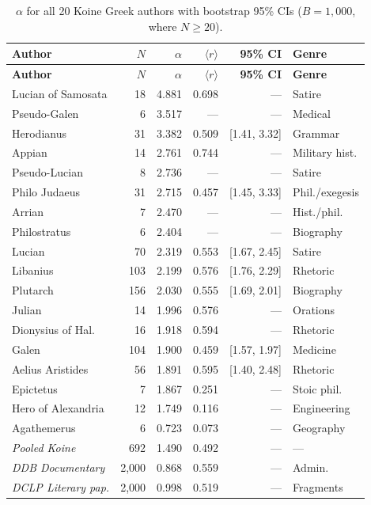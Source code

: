 \documentclass[11pt,letterpaper]{article}
\newcommand{\rbar}{\langle r \rangle}
\newcommand{\al}{\alpha}
\begin{document}
\begin{longtable}{lrrrrl}
\caption{$\al$ for all 20 Koine Greek authors with bootstrap 95\%
CIs ($B = 1{,}000$, where $N \geq 20$).} \\
\toprule
\textbf{Author} & $N$ & $\al$ & $\rbar$ & \textbf{95\% CI} &
\textbf{Genre} \\
\midrule
\endfirsthead
\toprule
\textbf{Author} & $N$ & $\al$ & $\rbar$ & \textbf{95\% CI} &
\textbf{Genre} \\
\midrule
\endhead
Lucian of Samosata & 18 & 4.881 & 0.698 & --- & Satire \\
Pseudo-Galen & 6 & 3.517 & --- & --- & Medical \\
Herodianus & 31 & 3.382 & 0.509 & [1.41, 3.32] & Grammar \\
Appian & 14 & 2.761 & 0.744 & --- & Military hist. \\
Pseudo-Lucian & 8 & 2.736 & --- & --- & Satire \\
Philo Judaeus & 31 & 2.715 & 0.457 & [1.45, 3.33] & Phil./exegesis \\
Arrian & 7 & 2.470 & --- & --- & Hist./phil. \\
Philostratus & 6 & 2.404 & --- & --- & Biography \\
Lucian & 70 & 2.319 & 0.553 & [1.67, 2.45] & Satire \\
Libanius & 103 & 2.199 & 0.576 & [1.76, 2.29] & Rhetoric \\
Plutarch & 156 & 2.030 & 0.555 & [1.69, 2.01] & Biography \\
Julian & 14 & 1.996 & 0.576 & --- & Orations \\
Dionysius of Hal. & 16 & 1.918 & 0.594 & --- & Rhetoric \\
Galen & 104 & 1.900 & 0.459 & [1.57, 1.97] & Medicine \\
Aelius Aristides & 56 & 1.891 & 0.595 & [1.40, 2.48] & Rhetoric \\
Epictetus & 7 & 1.867 & 0.251 & --- & Stoic phil. \\
Hero of Alexandria & 12 & 1.749 & 0.116 & --- & Engineering \\
Agathemerus & 6 & 0.723 & 0.073 & --- & Geography \\
\midrule
\textit{Pooled Koine} & 692 & 1.490 & 0.492 & --- & --- \\
\textit{DDB Documentary} & 2{,}000 & 0.868 & 0.559 & --- & Admin. \\
\textit{DCLP Literary pap.} & 2{,}000 & 0.998 & 0.519 & --- & Fragments \\
\bottomrule
\end{longtable}
\end{document}
